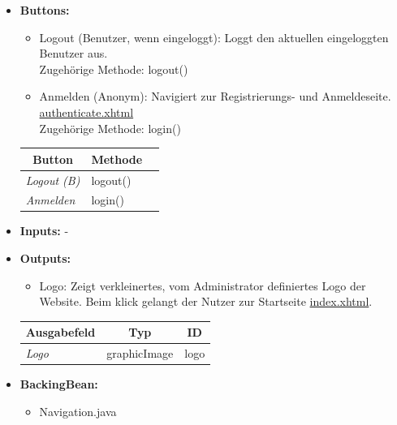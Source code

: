 \begin{itemize}
			\item \textbf{Buttons:}
				\begin{itemize}
					\item Logout (Benutzer, wenn eingeloggt): Loggt den aktuellen eingeloggten Benutzer aus. \\ Zugehörige Methode: logout()
					\item Anmelden (Anonym): Navigiert zur Registrierungs- und Anmeldeseite. \hyperlink{authenticate}{authenticate.xhtml} \\ Zugehörige Methode: login()
				\end{itemize}
				\begin{center}
					\begin{longtable}{|p{4cm} |p{4cm} | p{4cm}|}
					
						\hline \multicolumn{1}{|c|}{\textbf{Button}} & \multicolumn{1}{|c|}{\textbf{Methode}} \\ \hline
						\endfirsthead
						\hline
						\endlastfoot
					
							\textit{Logout (B)} & logout()\\ \hline
							\textit{Anmelden} & login()\\ \hline
					\end{longtable}
				\end{center}
			\item \textbf{Inputs:} -
			\item \textbf{Outputs:}
				\begin{itemize}
					\item Logo: Zeigt verkleinertes, vom Administrator definiertes Logo der Website. Beim klick gelangt der Nutzer zur Startseite \hyperlink{index}{index.xhtml}.
				\end{itemize}
				\begin{center}
					\begin{longtable}{|p{5cm} | p{4cm}|p{3cm}|}
						
						\hline \multicolumn{1}{|c|}{\textbf{Ausgabefeld}} & \multicolumn{1}{|c|}{\textbf{Typ}}  &  \multicolumn{1}{|c|}{\textbf{ID}} \\ \hline
						\endfirsthead
						\hline
						\endlastfoot
						\textit{Logo}  & graphicImage & logo \\ \hline
					\end{longtable}
				\end{center}
			\item \textbf{BackingBean:}
				\begin{itemize}
					\item Navigation.java
				\end{itemize}
		\end{itemize}
		
